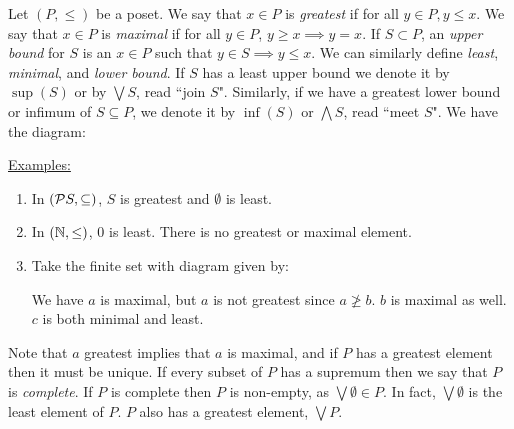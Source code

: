 \documentclass[10pt,a4paper]{article}
\begin{document}
Let $(P, \leq)$ be a poset. We say that $x \in P$ is \emph{greatest} if for all $y \in P, y \leq x$. We say that $x \in P$ is \emph{maximal} if for all $y \in P$, $y \geq x \implies y = x$. If $S \subset P$, an \emph{upper bound} for $S$ is an $x \in P$ such that $y \in S \implies y \leq x$. We can similarly define \emph{least}, \emph{minimal}, and \emph{lower bound}. If $S$ has a least upper bound we denote it by $\sup(S)$ or by $\bigvee S$, read ``join $S$". Similarly, if we have a greatest lower bound or infimum of $S \subseteq P$, we denote it by $\inf(S)$ or $\bigwedge S$, read ``meet $S$". We have the diagram:
\begin{center}
\end{center}
\hspace*{-1em}\underline{Examples:}
\begin{enumerate}
\item In $(\mathcal{P} S, \subseteq)$, $S$ is greatest and $\emptyset$ is least.
\item In $(\mathbb{N}, \leq)$, $0$ is least. There is no greatest or maximal element.
\item Take the finite set with diagram given by:\\
\begin{minipage}{0.2\textwidth}
\centering
{}
\end{minipage}
\begin{minipage}{0.5\textwidth}
We have $a$ is maximal, but $a$ is not greatest since $a \ngeq b$. $b$ is maximal as well. $c$ is both minimal and least.
\end{minipage}
\end{enumerate}
Note that $a$ greatest implies that $a$ is maximal, and if $P$ has a greatest element then it must be unique. If every subset of $P$ has a supremum then we say that $P$ is \emph{complete}. If $P$ is complete then $P$ is non-empty, as $\bigvee\emptyset \in P$. In fact, $\bigvee\emptyset$ is the least element of $P$. $P$ also has a greatest element, $\bigvee P$.
\end{document}
